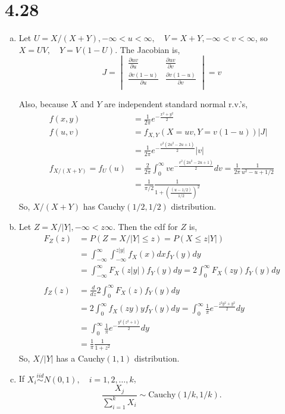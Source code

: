\documentclass[letterpaper]{article}
\newcommand{\intii}{\int_{-\infty}^\infty}
\newcommand{\intzi}{\int_0^\infty}
\begin{document}
    \section*{4.28}
    \begin{enumerate}[(a)]
    \item
    Let $U = X/(X+Y), -\infty < u < \infty, \quad V=X+Y, -\infty < v < \infty$, so $X = UV, \quad Y=V(1-U)$.
    The Jacobian is,
    \[
    J = \begin{vmatrix}
    \frac{\partial uv}{\partial u} & \frac{\partial uv}{\partial v} \\
    \frac{\partial v(1-u)}{\partial u} & \frac{\partial v(1-u)}{\partial v} \\
    \end{vmatrix} = v
    \]

    Also, because $X$ and $Y$ are independent standard normal r.v.'s, 
    \begin{align*}
    f(x,y) & = \frac{1}{2\pi} e^{-\frac{x^2+y^2}{2}} \\
    f(u,v) & = f_{X,Y}(X=uv, Y=v(1-u))|J| \\
    & = \frac{1}{2\pi}e^{-\frac{v^2(2u^2-2u+1)}{2}}|v| \\
    f_{X/(X+Y)} = f_U(u) & = \frac{2}{2\pi} \intzi ve^{-\frac{v^2(2u^2-2u+1)}{2}} dv = \frac{1}{2\pi} \frac{1}{u^2-u+1/2} \\
    & = \frac{1}{\pi/2} \frac{1}{1+\left(\frac{(u-1/2)}{1/2}\right)^2}
    \end{align*}
    So, $X/(X+Y)$ has Cauchy$(1/2, 1/2)$ distribution.
    \item Let $Z = X/|Y|, -\infty < z \infty$. Then the cdf for $Z$ is,
    \begin{align*}
    F_Z(z) & = P(Z = X/|Y| \le z) = P(X \le z|Y|) \\
    & = \intii \int_{-\infty}^{z|y|} f_{X} (x) dx f_Y(y) dy \\
    & = \intii F_X(z|y|) f_Y(y) dy = 2 \intzi F_X(zy) f_Y(y) dy \\
    \\
    f_Z(z) & = \frac{d}{dz} 2 \intzi F_X(z) f_Y(y) dy \\
    & = 2 \intzi f_X(zy) y f_Y(y) dy 
    = \intzi \frac{1}{\pi} e^{-\frac{z^2y^2+y^2}{2}} dy \\
    & = \intzi \frac{1}{\pi} e^{-\frac{y^2(z^2+1)}{2}} dy \\
    & = \frac{1}{\pi}\frac{1}{1+z^2}
    \end{align*}
    So, $X/|Y|$ has a Cauchy$(1,1)$ distribution.
    \item If $X_i \stackrel{iid}{\sim} N(0,1), \quad i=1, 2, \dots, k$, 
    \[
    \frac{X_j}{\sum_{i=1}^k X_i} \sim \text{Cauchy}(1/k, 1/k).
    \]
    \end{enumerate}
\end{document}
